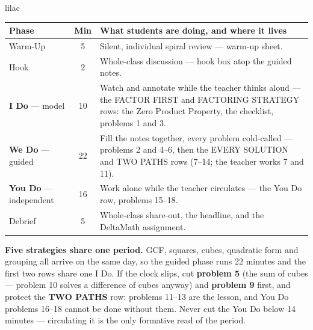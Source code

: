 \documentclass[10pt]{article}
\begin{document}
\boxguard[22]
\begin{skillbox}{lilac}
\small
\renewcommand{\arraystretch}{1.25}
\begin{tabularx}{\linewidth}{@{} l c X @{}}
\textbf{Phase} & \textbf{Min} & \textbf{What students are doing, and where it lives} \\
\midrule
Warm-Up                       & 5  & Silent, individual spiral review --- warm-up sheet. \\
Hook                          & 2  & Whole-class discussion --- hook box atop the guided notes. \\
\textbf{I Do} --- model       & 10 & Watch and annotate while the teacher thinks aloud --- the FACTOR FIRST and FACTORING STRATEGY rows: the Zero Product Property, the checklist, problems 1 and 3. \\
\textbf{We Do} --- guided     & 22 & Fill the notes together, every problem cold-called --- problems 2 and 4--6, then the EVERY SOLUTION and TWO PATHS rows (7--14; the teacher works 7 and 11). \\
\textbf{You Do} --- independent & 16 & Work alone while the teacher circulates --- the You Do row, problems 15--18. \\
Debrief                       & 5  & Whole-class share-out, the headline, and the DeltaMath assignment. \\
\end{tabularx}

\smallskip
\textbf{Five strategies share one period.} GCF, squares, cubes, quadratic form and grouping all
arrive on the same day, so the guided phase runs 22 minutes and the first two rows share one
I Do. If the clock slips, cut \textbf{problem 5} (the sum of cubes --- problem 10 solves a
difference of cubes anyway) and \textbf{problem 9} first, and protect the \textbf{TWO PATHS}
row: problems 11--13 are the lesson, and You Do problems 16--18 cannot be done without them.
Never cut the You Do below 14 minutes --- circulating it is the only formative read of the
period.
\end{skillbox}
\end{document}
